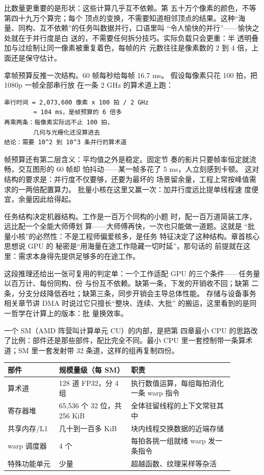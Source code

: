 比数量更重要的是形状：这些计算几乎互不依赖。第
五十万个像素的颜色，不等第四十九万个算完；每个
顶点的变换，不需要知道相邻顶点的结果。这种“海
量、同构、互不依赖”的任务叫数据并行，口语里叫
“令人愉快的并行”——愉快之处就在于并行度是白
送的，不需要任何拆分技巧。实际负载只会更重：半
透明叠加与过绘制让同一像素被重复着色，每帧的片
元数往往是像素数的 2 到 4 倍，上面还是保守估计。

拿帧预算反推一次结构。60 帧每秒给每帧 16.7 ms。
假设每像素只花 100 拍，把 1080p 一帧全部串行放
在一条 2 GHz 的算术道上跑：

\begin{lstlisting}
串行时间 = 2,073,600 像素 x 100 拍 / 2 GHz
        ≈ 104 ms，是帧预算的 6 倍多
再乘两条：每像素实际远不止 100 拍，
        几何与光栅化还没算进去
结论：需要 10^2 到 10^3 条并行的算术道
\end{lstlisting}

帧预算还有第二层含义：平均值之外是稳定。固定节
奏的影片只要帧率恒定就流畅，交互图形的 60 帧却
怕抖动——某一帧多花了 5 ms，人立刻感到卡顿。
这对结构的要求是：并行度不仅要够，还要为最坏的
场景留余量，工程上常按峰值需求的一两倍配置算力。
批量小核在这里又赢一次：加并行度远比提单线程速
度便宜，余量因此给得起。

任务结构决定机器结构。工作是一百万个同构的小题
时，配一百万道简装工序，远比配一个全能大师傅划
算——大师傅再快，一次也只能做一道题。这就是
“批量小核”的必然性：不是工程师偏爱核多，是任务
特征决定了这种结构。章首核心思想说 GPU 的
秘密是“用海量在途工作隐藏一切时延”，那句话的
前提就在这里：需求本身得先提供足够多的在途工作。

这段推理还给出一张可复用的判定单：一个工作适配
GPU 的三个条件——任务量以百万计、每份同构、份
与份互不依赖。缺第一条，下发的开销收不回；缺第
二条，分支分歧降低吞吐；缺第三条，同步开销会主导总体性能。
存储与设备事务相关章节讲 DMA 时说过它只擅长“整块、连续、大批”
的搬运，这里看到的是同一哲学在计算上的版本：批
量换效率。

一个 SM（AMD 阵营叫计算单元 CU）的内部，是把第
四章最小 CPU 的思路改
了比例：部件还是那些部件，配比完全不同。最小
CPU 里一套控制带一条算术道；SM 里一套发射带 32
条道，这样的组再复制四份。

\begin{longtable}{L{0.2\linewidth}L{0.28\linewidth}L{0.4\linewidth}}
\toprule
部件 & 规模量级（每 SM） & 职责 \\
\midrule
算术道 & 128 道 FP32，分 4 组 & 执行数值运算，每组每拍消化一条 warp 指令 \\\tablerowrule
寄存器堆 & 65,536 个 32 位，共 256 KiB & 全体驻留线程的上下文常驻其中 \\\tablerowrule
共享内存/L1 & 几十到一百多 KiB & 块内线程交换数据的近端存储 \\\tablerowrule
warp 调度器 & 4 个 & 每拍各挑一组就绪 warp 发一条指令 \\\tablerowrule
特殊功能单元 & 少量 & 超越函数、纹理采样等杂活 \\
\bottomrule
\end{longtable}

